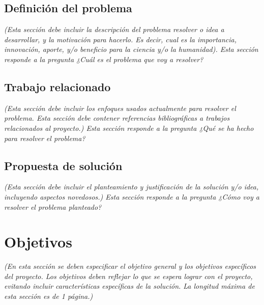 \documentclass[11pt,letterpaper]{article}
\begin{document}
\subsection{Definición del problema} 
\emph{(Esta sección debe incluir la descripción del problema resolver o idea a desarrollar, y la motivación para hacerlo. Es decir, cual es la importancia, innovación, aporte, y/o beneficio para la ciencia y/o la humanidad). Esta sección responde a la pregunta ¿Cuál es el problema que voy a resolver?}

\subsection{Trabajo relacionado} 
\emph{(Esta sección debe incluir los enfoques usados actualmente para resolver el problema. Esta sección debe contener referencias bibliográficas a trabajos relacionados al proyecto.) Esta sección responde a la pregunta ¿Qué se ha hecho para resolver el problema?}

\subsection{Propuesta de solución}
\emph{(Esta sección debe incluir el planteamiento y justificación de la solución y/o idea, incluyendo aspectos novedosos.) Esta sección responde a la pregunta ¿Cómo voy a resolver el problema planteado?}




\section{Objetivos}
\emph{(En esta sección se deben especificar el objetivo general y los objetivos específicos del proyecto. Los objetivos deben reflejar lo que se espera lograr con el proyecto, evitando incluir características específicas de la solución. La longitud máxima de esta sección es de 1 página.)}
\end{document}
